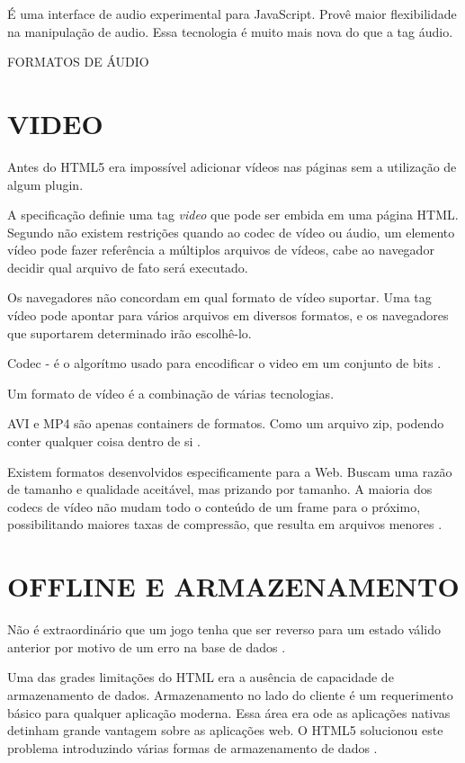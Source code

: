 \documentclass[
12pt,
a4paper,
portuges,
draft
]{report}
\begin{document}
É uma interface de audio experimental para JavaScript. Provê maior
flexibilidade na manipulação de audio. Essa tecnologia é muito mais
nova do que a tag áudio.

FORMATOS DE ÁUDIO


\section{VIDEO}

Antes do HTML5 era impossível adicionar vídeos nas páginas sem a utilização de algum plugin.

A specificação definie uma tag \textit{video} que pode ser embida em uma página HTML. Segundo \cite{diveIntohtml} não existem restrições quando ao codec de vídeo ou áudio, um elemento vídeo pode fazer referência a múltiplos arquivos de vídeos, cabe ao navegador decidir qual arquivo de fato será executado.

Os navegadores não concordam em qual formato de vídeo suportar.
Uma tag vídeo pode apontar para vários arquivos em diversos formatos, e os navegadores que suportarem determinado irão escolhê-lo.

Codec - é o algorítmo usado para encodificar o video em um conjunto de bits \cite{diveIntohtml}.

Um formato de vídeo é a combinação de várias tecnologias.


AVI e MP4 são apenas containers de formatos. Como um arquivo zip, podendo conter qualquer coisa dentro de si \autocite{diveIntohtml}.

Existem formatos desenvolvidos especificamente para a Web. Buscam uma razão de tamanho e qualidade aceitável, mas prizando por tamanho. A maioria dos codecs de vídeo não mudam todo o conteúdo de um frame para o próximo, possibilitando maiores taxas de compressão, que resulta em arquivos menores \autocite{diveIntohtml}.

\section{OFFLINE E ARMAZENAMENTO}

Não é extraordinário que um jogo tenha que ser reverso para um estado
válido anterior por motivo de um erro na base de dados \autocite[pp. 5]{browserGamesTechnologyAndFuture}.

Uma das grades limitações do HTML era a ausência de capacidade
de armazenamento de dados. Armazenamento no lado do cliente é um
requerimento básico para qualquer aplicação moderna. Essa área
era ode as aplicações nativas detinham grande vantagem sobre as
aplicações web. O HTML5 solucionou este problema introduzindo várias
formas de armazenamento de dados \autocite{html5Tradeoffs}.
\end{document}
